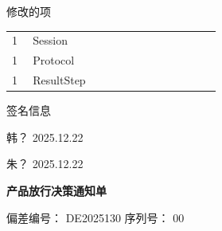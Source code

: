 \documentclass[UTF8,10pt,a4paper,fontset=fandol]{ctexart}
\newcommand{\fieldvalue}[1]{#1}
\newcommand{\handwritten}[1]{#1}
\begin{document}
\bigskip

\noindent 修改的项

\begin{tabular}{@{}p{0.08\linewidth}p{0.72\linewidth}@{}}
1 &
\fieldvalue{Session}
\\
1 &
\fieldvalue{Protocol}
\\
1 &
\fieldvalue{ResultStep}
\end{tabular}

\bigskip

\noindent 签名信息

\vspace{7cm}

\noindent
\handwritten{韩？}
\hfill
\handwritten{2025.12.22}

\medskip

\noindent
\handwritten{朱？}
\hfill
\handwritten{2025.12.22}

\newpage

\begin{center}
\textbf{产品放行决策通知单}
\end{center}

\noindent
偏差编号：
\fieldvalue{DE2025130}
\hfill
序列号：
\fieldvalue{00}

\bigskip
\end{document}
